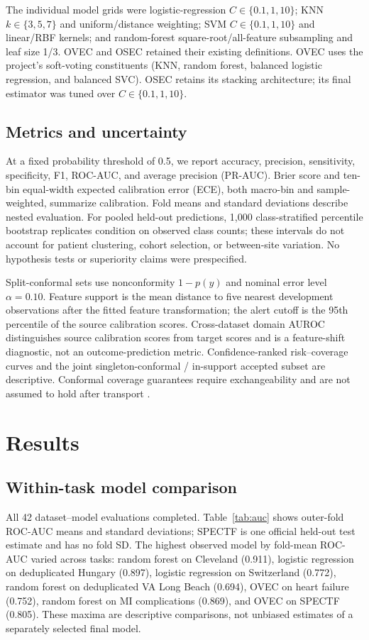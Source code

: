 \documentclass[conference]{IEEEtran}
\begin{document}
The individual model grids were logistic-regression $C\in\{0.1,1,10\}$; KNN $k\in\{3,5,7\}$ and uniform/distance weighting; SVM $C\in\{0.1,1,10\}$ and linear/RBF kernels; and random-forest square-root/all-feature subsampling and leaf size 1/3. OVEC and OSEC retained their existing definitions. OVEC uses the project’s soft-voting constituents (KNN, random forest, balanced logistic regression, and balanced SVC). OSEC retains its stacking architecture; its final estimator was tuned over $C\in\{0.1,1,10\}$.

\subsection{Metrics and uncertainty}
At a fixed probability threshold of 0.5, we report accuracy, precision, sensitivity, specificity, F1, ROC-AUC, and average precision (PR-AUC). Brier score and ten-bin equal-width expected calibration error (ECE), both macro-bin and sample-weighted, summarize calibration. Fold means and standard deviations describe nested evaluation. For pooled held-out predictions, 1,000 class-stratified percentile bootstrap replicates condition on observed class counts; these intervals do not account for patient clustering, cohort selection, or between-site variation. No hypothesis tests or superiority claims were prespecified.

Split-conformal sets use nonconformity $1-p(y)$ and nominal error level $\alpha=0.10$. Feature support is the mean distance to five nearest development observations after the fitted feature transformation; the alert cutoff is the 95th percentile of the source calibration scores. Cross-dataset domain AUROC distinguishes source calibration scores from target scores and is a feature-shift diagnostic, not an outcome-prediction metric. Confidence-ranked risk--coverage curves and the joint singleton-conformal / in-support accepted subset are descriptive. Conformal coverage guarantees require exchangeability and are not assumed to hold after transport \cite{angelopoulos2023conformal}.

\section{Results}
\subsection{Within-task model comparison}
All 42 dataset--model evaluations completed. Table~\ref{tab:auc} shows outer-fold ROC-AUC means and standard deviations; SPECTF is one official held-out test estimate and has no fold SD. The highest observed model by fold-mean ROC-AUC varied across tasks: random forest on Cleveland (0.911), logistic regression on deduplicated Hungary (0.897), logistic regression on Switzerland (0.772), random forest on deduplicated VA Long Beach (0.694), OVEC on heart failure (0.752), random forest on MI complications (0.869), and OVEC on SPECTF (0.805). These maxima are descriptive comparisons, not unbiased estimates of a separately selected final model.
\end{document}

